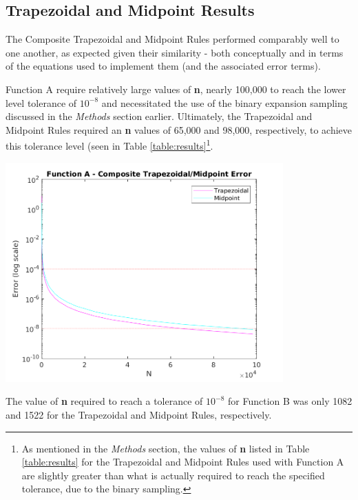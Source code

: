 \documentclass[a4paper]{article}
\begin{document}
\subsection{Trapezoidal and Midpoint Results}\label{results:a}

The Composite Trapezoidal and Midpoint Rules performed comparably well to one another, as expected given their similarity - both conceptually and in terms of the equations used to implement them (and the associated error terms).

Function A require relatively large values of \textbf{n}, nearly 100,000 to reach the lower level tolerance of $10^{-8}$ and necessitated the use of the binary expansion sampling discussed in the \textit{Methods} section earlier. Ultimately, the Trapezoidal and Midpoint Rules required an \textbf{n} values of 65,000 and 98,000, respectively, to achieve this tolerance level (seen in Table \ref{table:results}\footnote{As mentioned in the \textit{Methods} section, the values of \textbf{n} listed in Table \ref{table:results} for the Trapezoidal and Midpoint Rules used with Function A are slightly greater than what is actually required to reach the specified tolerance, due to the binary sampling.}.  

\begin{center}
	\includegraphics[width=0.8\textwidth]{../output/a_trapezoidal_midpoint.png}
	\label{fig:a_trap_mid}
\end{center}

The value of \textbf{n} required to reach a tolerance of $10^{-8}$ for Function B was only 1082 and 1522 for the Trapezoidal and Midpoint Rules, respectively.
\end{document}
